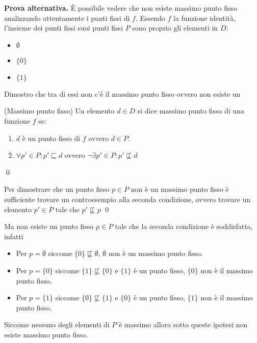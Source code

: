 \textbf{Prova alternativa.} È possibile vedere che non esiste massimo
punto fisso analizzando attentamente i punti fissi di $f$. Essendo $f$ la
funzione identità, l'insieme dei punti fissi suoi punti fissi $P$ sono proprio gli elementi in $D$:
\begin{itemize}
  \item $\emptyset$
  \item $\{0\}$
  \item $\{1\}$
\end{itemize}
Dimostro che tra di essi non c'é il massimo punto fisso ovvero non esiste un 
\begin{mydef}(Massimo punto fisso)
Un elemento $d \in D$ si dice massimo punto fisso di una funzione $f$ se:
\begin{enumerate}
	\item $d$ è un punto fisso di $f$ ovvero $d \in P$.
	\item $\forall p' \in P: p' \sqsubseteq d$ ovvero $\neg \exists p' \in P : p' \not \sqsubseteq d$
\end{enumerate}
\qed
\end{mydef}
\begin{Oss}
	Per dimostrare che un punto fisso $p \in P$ non è un massimo punto fisso è sufficiente trovare un controesempio alla 
	seconda condizione, ovvero trovare un elemento $p' \in P$ tale che $p' \not \sqsubseteq p$
\qed
\end{Oss}

Ma non esiste un punto fisso $p \in P$ tale che la seconda condizione è soddisfatta, infatti
\begin{itemize}
	\item Per $\boxed{p = \emptyset}$ siccome $\{0\} \not \sqsubseteq \emptyset$, $\emptyset$ non è un massimo punto fisso.
	\item Per $\boxed{p = \{0\}}$ siccome $\{1\} \not \sqsubseteq \{0\}$ e $\{1\}$ è un punto fisso, $\{0\}$ non è il massimo punto fisso.
	\item Per $\boxed{p = \{1\}}$ siccome $\{0\} \not \sqsubseteq \{1\}$ e $\{0\}$ è un punto fisso, $\{1\}$ non è il massimo punto fisso.
\end{itemize}
Siccome nessuno degli elementi di $P$ è massimo allora sotto queste ipotesi non esiste massimo punto fisso.
\cvd
